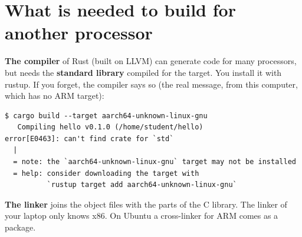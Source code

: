 \section*{What is needed to build for another processor}
\begin{center}
\end{center}
\textbf{The compiler} of Rust (built on LLVM) can generate code for many processors, but needs the \textbf{standard library} compiled for the target. You install it with rustup. If you forget, the compiler says so (the real message, from this computer, which has no ARM target):
\begin{verbatim}
$ cargo build --target aarch64-unknown-linux-gnu
   Compiling hello v0.1.0 (/home/student/hello)
error[E0463]: can't find crate for `std`
  |
  = note: the `aarch64-unknown-linux-gnu` target may not be installed
  = help: consider downloading the target with
          `rustup target add aarch64-unknown-linux-gnu`
\end{verbatim}
\textbf{The linker} joins the object files with the parts of the C library. The linker of your laptop only knows x86. On Ubuntu a cross-linker for ARM comes as a package.

